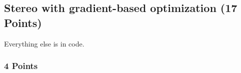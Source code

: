 \newif\ifvimbug
\vimbugfalse

\ifvimbug

\fi


\subsection{Stereo with gradient-based optimization (17 Points)}
\setcounter{subsubsection}{5}
Everything else is in code.
\subsubsection{4 Points}
